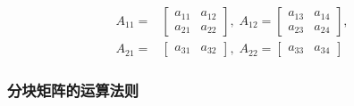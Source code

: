 \begin{align*}
  A_{11} =& \left[\begin{array}{cc}
    a_{11} & a_{12} \\
    a_{21} & a_{22}
  \end{array}\right], \;
  A_{12} = \left[\begin{array}{cc}
    a_{13} & a_{14} \\
    a_{23} & a_{24}
  \end{array}\right], \\[0.5em]
  A_{21} =& \left[\begin{array}{cc}
    a_{31} & a_{32}
  \end{array}\right], \;
  A_{22} = \left[\begin{array}{cc}
    a_{33} & a_{34}
  \end{array}\right]
\end{align*}

\subsubsection{分块矩阵的运算法则}
